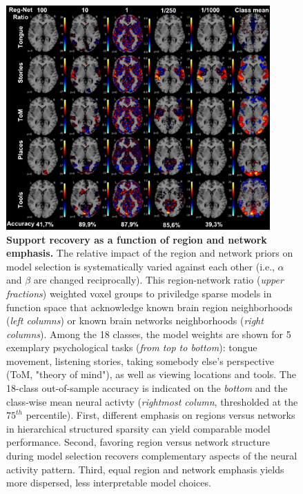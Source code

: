 \documentclass{article}
\begin{document}
\begin{figure}
\begin{centering}
\includegraphics[width=0.90\textwidth]{../figures/reg_net_ratio_colin.pdf}
\caption{\textbf{Support recovery as a function of
region and network emphasis.}
The relative impact of the region and network priors
on model selection
is systematically varied against each other
(i.e., $\alpha$ and $\beta$ are changed reciprocally).
This region-network ratio (\textit{upper fractions}) weighted voxel groups
to priviledge sparse models in function space
that acknowledge known brain region neighborhoods
(\textit{left columns}) or
known brain networks neighborhoods
(\textit{right columns}).
Among the 18 classes, the model weights are shown for 5 exemplary
psychological
tasks (\textit{from top to bottom}): tongue movement, listening stories,
taking somebody else's perspective (ToM, "theory of mind"),
as well as
viewing locations and tools.
The 18-class out-of-sample accuracy is indicated
on the \textit{bottom} and
the class-wise mean neural activty
(\textit{rightmost column}, thresholded at the $75^{th}$ percentile).
%
First,
different emphasis on regions versus networks
in hierarchical structured sparsity can
yield comparable model performance.
%
Second,
favoring region versus network structure during model selection
recovers complementary aspects of the neural activity pattern.
%
Third,
equal region and network emphasis yields more dispersed,
less interpretable model choices.
}
\label{fig_regnetratio}
\end{centering}
\end{figure}
\end{document}
